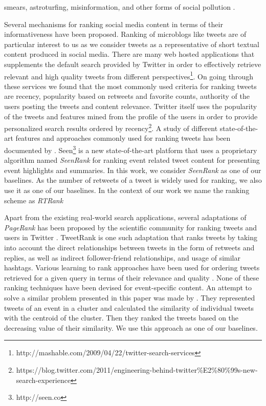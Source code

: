 smears, astroturfing, misinformation, and other forms of social pollution \cite{ratkiewicz2011truthy}.


Several mechanisms for ranking social media content in terms of their informativeness have been proposed. Ranking of microblogs like tweets are of particular interest to us as we consider tweets as a representative of short textual content produced in social media. There are many web hosted applications that supplements the default search provided by Twitter in order to effectively retrieve relevant and high quality tweets from different perspectives\footnote{\tiny http://mashable.com/2009/04/22/twitter-search-services}. On going through these services we found that the most commonly used criteria for ranking tweets are recency, popularity based on retweets and favorite counts, authority of the users posting the tweets and content relevance. Twitter itself uses the popularity of the tweets and features mined from the profile of the users in order to provide personalized search results ordered by recency\footnote{\tiny https://blog.twitter.com/2011/engineering-behind-twitter\%E2\%80\%99s-new-search-experience}. A study of different state-of-the-art features and approaches commonly used for ranking tweets has been documented by \cite{Damak2013, nagmoti2010ranking}. Seen\footnote{\tiny http://seen.co} is a new state-of-the-art platform that uses a proprietary algorithm named \textit{SeenRank} for ranking event related tweet content for presenting event highlights and summaries. In this work, we consider \textit{SeenRank} as one of our baselines. As the number of retweets of a tweet is widely used for ranking, we also use it as one of our baselines. In the context of our work we name the ranking scheme as \textit{RTRank}

Apart from the existing real-world search applications, several adaptations of \textit{PageRank} \cite{page1999pagerank} has been proposed by the scientific community for ranking tweets and users in Twitter \cite{weng2010twitterrank,tunkelang2009twitter, hallberg2012adaptation}. TweetRank \cite{hallberg2012adaptation} is one such adaptation that ranks tweets by taking into account the direct relationships between tweets in the form of retweets and replies, as well as indirect follower-friend relationships, and usage of similar hashtags. Various learning to rank approaches have been used for ordering tweets retrieved for a given query in terms of their relevance and quality \cite{Duan2010,mccreadie2013relevance,vosecky2012searching}. None of these ranking techniques have been devised for event-specific content. An attempt to solve a similar problem presented in this paper was made by \cite{becker2011selecting}. They represented tweets of an event in a cluster and calculated the similarity of individual tweets with the centroid of the cluster. Then they ranked the tweets based on the decreasing value of their similarity. We use this approach as one of our baselines.

